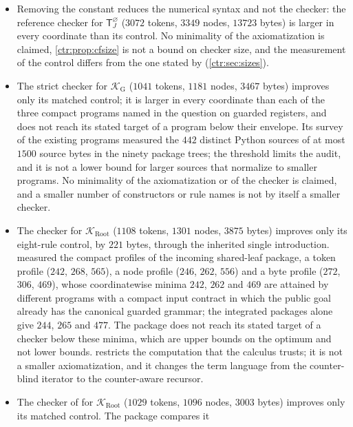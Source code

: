 \begin{itemize}
same formula is supplied, and no universal executable proof compiler is claimed.
\item Removing the constant reduces the numerical syntax and not the checker: the reference
checker for $\mathsf T_J^{\varnothing}$ ($3072$ tokens, $3349$ nodes, $13723$ bytes) is
larger in every coordinate than its control. No minimality of the axiomatization is
claimed, \cref{ctr:prop:cfsize} is not a bound on checker size, and the measurement of the
control differs from the one stated by  (\cref{ctr:sec:sizes}).
\item The strict checker for $\mathcal K_{\mathrm G}$ ($1041$ tokens, $1181$ nodes, $3467$
bytes) improves only its matched control; it is larger in every coordinate than each of the
three compact programs named in the question on guarded registers, and  does not
reach its stated target of a program below their envelope. Its survey of the existing
programs measured the $442$ distinct Python sources of at most $1500$ source bytes in the
ninety package trees; the threshold limits the audit, and it is not a lower bound for
larger sources that normalize to smaller programs. No minimality of the axiomatization or of
the checker is claimed, and a smaller number of constructors or rule names is not by itself
a smaller checker.
\item The checker for $\mathcal K_{\mathrm{Root}}$ ($1108$ tokens, $1301$ nodes, $3875$ bytes)
improves only its eight-rule control, by $221$ bytes, through the inherited single introduction.
 measured the compact profiles of the incoming shared-leaf package, a token
profile ($242$, $268$, $565$), a node profile ($246$, $262$, $556$) and a byte profile ($272$,
$306$, $469$), whose coordinatewise minima $242$, $262$ and $469$ are attained by different
programs with a compact input contract in which the public goal already has the canonical
guarded grammar; the integrated packages alone give $244$, $265$ and $477$. The package does
not reach its stated target of a checker below these minima, which are upper bounds on the
optimum and not lower bounds.  restricts the computation that the
calculus trusts; it is not a smaller axiomatization, and it changes the term language from the
counter-blind iterator to the counter-aware recursor.
\item The checker of  for $\mathcal K_{\mathrm{Root}}$ ($1029$
tokens, $1096$ nodes, $3003$ bytes) improves only its matched control. The package compares it

\end{itemize}
